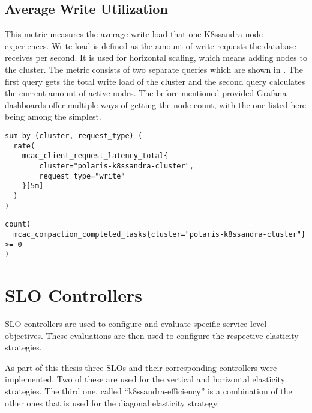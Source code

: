 \subsection{Average Write Utilization}
\label{sec:metrics-average-write-utilization}

This metric measures the average write load that one K8ssandra node experiences. Write load is defined as the amount of write requests the database receives per second. It is used for horizontal scaling, which means adding nodes to the cluster. The metric consists of two separate queries which are shown in . The first query gets the total write load of the cluster and the second query calculates the current amount of active nodes. The before mentioned provided Grafana dashboards offer multiple ways of getting the node count, with the one listed here being among the simplest.

\begin{lstlisting}[caption={PromQL query used to get the current write throughput},
                    captionpos=b,
                    label=lst:writeUtilization,
                    float]
sum by (cluster, request_type) (
  rate(
    mcac_client_request_latency_total{
        cluster="polaris-k8ssandra-cluster",
        request_type="write"
    }[5m]
  )
)
\end{lstlisting}

\begin{lstlisting}[caption={PromQL query used to get the amount of nodes in the K8ssandra cluster},
                    captionpos=b,
                    label=lst:getNodeCount,
                    float]
count(
  mcac_compaction_completed_tasks{cluster="polaris-k8ssandra-cluster"} >= 0
)
\end{lstlisting}

\section{SLO Controllers}
\label{sec:slos}

SLO controllers are used to configure and evaluate specific service level objectives. These evaluations are then used to configure the respective elasticity strategies.

As part of this thesis three SLOs and their corresponding controllers were implemented. Two of these are used for the vertical and horizontal elasticity strategies. The third one, called ``k8ssandra-efficiency'' is a combination of the other ones that is used for the diagonal elasticity strategy.

